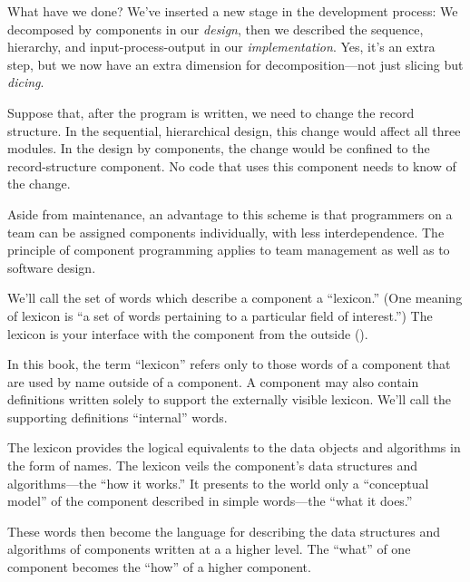 What have we done? We've inserted a new stage in the development
process: We decomposed by components in our \emph{design}, then we
described the sequence, hierarchy, and input-process-output in our
\emph{implementation}.  Yes, it's an extra step, but we now have an
extra dimension for decomposition---not just slicing but
\emph{dicing}.

Suppose that, after the program is written, we need to change the
record structure. In the sequential, hierarchical design, this change
would affect all three modules. In the design by components, the
change would be confined to the record-structure component. No code
that uses this component needs to know of the change.

Aside from maintenance, an advantage to this scheme is that
programmers on a team can be assigned components individually, with
less interdependence.  The principle of component programming applies
to team management as well as to software design.

We'll call the set of words which describe a component a ``lexicon.''
(One meaning of lexicon is ``a set of words pertaining to a particular
field of interest.'') The lexicon is your interface with the component
from the outside ().

In this book, the term ``lexicon'' refers only to those words of a
component that are used by name outside of a component. A component
may also contain definitions written solely to support the externally
visible lexicon. We'll call the supporting definitions ``internal''
words.


The lexicon provides the logical equivalents to the data objects and
algorithms in the form of names. The lexicon veils the component's
data structures and algorithms---the ``how it works.'' It presents to
the world only a ``conceptual model'' of the component described in
simple words---the ``what it does.''

These words then become the language for describing the data
structures and algorithms of components written at a a higher level.
The ``what'' of one component becomes the ``how'' of a higher component.


